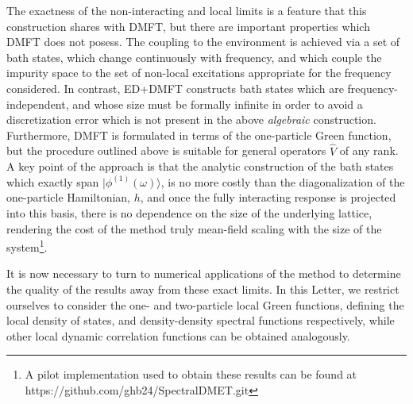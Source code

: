 \documentclass[aps,twocolumn,nobibnotes]{revtex4}
\begin{document}
The exactness of the non-interacting and local limits is a feature that this construction shares with DMFT, but there are important properties which 
DMFT does not posess. The coupling to the environment
is achieved via a set of bath states, which change continuously with frequency, and which couple the impurity space to the set of non-local excitations appropriate for the frequency considered. 
In contrast, ED+DMFT constructs bath states which are
frequency-independent, and whose size must be formally infinite in order to avoid a discretization error which is not present in the above {\em algebraic} 
construction. Furthermore, DMFT is formulated in terms of the one-particle Green function, but the procedure outlined above is suitable for 
general operators ${\hat V}$ of any rank. 
A key point of the approach is that the analytic construction
of the bath states which exactly span $|\phi^{(1)}(\omega) \rangle$, is no more costly than the diagonalization of the one-particle Hamiltonian, $h$, 
and once the fully interacting response is projected into this basis, there is no dependence on the size of the underlying lattice, rendering 
the cost of the method truly mean-field scaling with the size of the system\footnote{A pilot implementation used to obtain these results can be found at https://github.com/ghb24/SpectralDMET.git}. 

It is now necessary to turn to numerical applications of the method to determine the quality of the results away from these exact limits. 
In this Letter, we restrict ourselves to consider the one- and two-particle local Green functions,
defining the local density of states, and density-density spectral functions respectively, while other local dynamic correlation functions can be obtained analogously.
\end{document}
